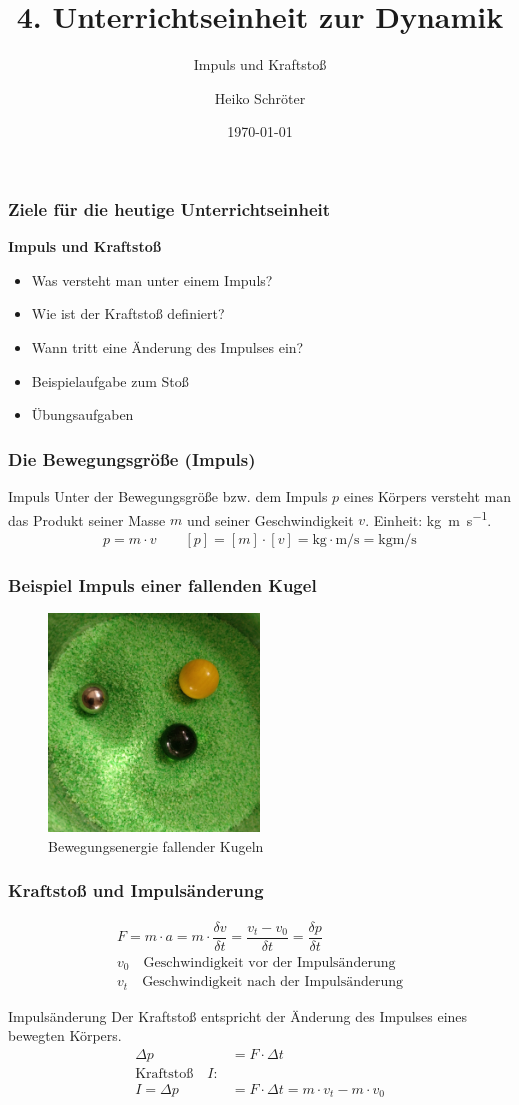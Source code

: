 \documentclass{article}
\title{4. Unterrichtseinheit zur Dynamik}
\subtitle{Impuls und Kraftstoß}
\author{Heiko Schröter}
\date{\today}
\begin{document}
\frame{\titlepage}

\frame
{
  \frametitle{Ziele für die heutige Unterrichtseinheit}
  \textbf{Impuls und Kraftstoß}
  \begin{itemize}
	\item Was versteht man unter einem Impuls?
	\item Wie ist der Kraftstoß definiert?
	\item Wann tritt eine Änderung des Impulses ein?
	\item Beispielaufgabe zum Stoß
	\item Übungsaufgaben
  \end{itemize}
}

\frame
{
  \frametitle{Die Bewegungsgröße (Impuls)}
\begin{block}{Impuls}
Unter der Bewegungsgröße bzw. dem Impuls $p$ eines Körpers versteht man das Produkt seiner Masse $m$ und seiner Geschwindigkeit $v$. Einheit: \si{\kilogram\meter\per\second}.
\begin{align*}
p=m\cdot v\quad\quad [p]=[m]\cdot[v]=\si{\kilogram}\cdot\si{\meter\per\second}=\si{\kilogram\meter\per\second}
\end{align*}
\end{block}
}

\frame
{
  \frametitle{Beispiel Impuls einer fallenden Kugel}
      \begin{figure}
	  \includegraphics[width=0.5\textwidth]{Impuls}
	  \vspace{-3mm}
	  \caption{Bewegungsenergie fallender Kugeln}
   \end{figure}
}

\frame
{
  \frametitle{Kraftstoß und Impulsänderung}
\begin{align*}
F=m\cdot a=m\cdot\dfrac{\delta v}{\delta t}=\dfrac{v_t-v_0}{\delta t}=\dfrac{\delta p}{\delta t}\\
v_0\quad\text{Geschwindigkeit vor der Impulsänderung}\\
v_t\quad\text{Geschwindigkeit nach der Impulsänderung}
\end{align*}
\begin{block}{Impulsänderung}
Der Kraftstoß entspricht der Änderung des Impulses eines bewegten Körpers.
\begin{align*}
\Delta p&=F\cdot \Delta t\\
\text{Kraftstoß}\quad I:\\
I=\Delta p&=F\cdot \Delta t=m\cdot v_t - m\cdot v_0
\end{align*}
\end{block}
}
\end{document}
